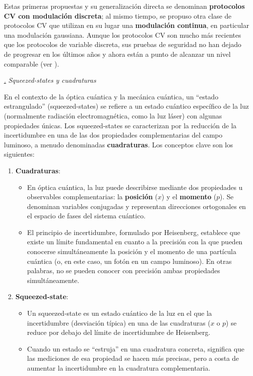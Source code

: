 \documentclass[a4paper,11pt]{book} %
\numberwithin{equation}{chapter}
\def\subsubiContadorIt{\par\addtocounter{subsubsection}{1}\underline{\it\thesubsubsection.}\hskip0.5cm \setcounter{subsubsubsectionIt}{0}}
\newcommand{\SubsubiIt}[1]{
		\subsubiContadorIt \textit{#1}
	}
\newcounter{subsubsubsectionIt}[subsubsection]
\begin{document}
Estas primeras propuestas y su generalización directa se denominan \textbf{protocolos CV con modulación discreta}; al mismo tiempo, se propuso otra clase de protocolos CV que utilizan en su lugar una \textbf{modulación continua}, en particular una modulación gaussiana. Aunque los protocolos CV son mucho más recientes que los protocolos de variable discreta, sus pruebas de seguridad no han dejado de progresar en los últimos años y ahora están a punto de alcanzar un nivel comparable (ver \cite{bib_QKD_resumen}).

		\SubsubiIt{Squeezed-states y cuadraturas}
		
En el contexto de la óptica cuántica y la mecánica cuántica, un ``estado estrangulado'' (squeezed-states) se refiere a un estado cuántico específico de la luz (normalmente radiación electromagnética, como la luz láser) con algunas propiedades únicas. Los squeezed-states se caracterizan por la reducción de la incertidumbre en una de las dos propiedades complementarias del campo luminoso, a menudo denominadas \textbf{cuadraturas}. Los conceptos clave son los siguientes: 
\begin{enumerate}
	\item \textbf{Cuadraturas}: 
	\begin{itemize}
		\item En óptica cuántica, la luz puede describirse mediante dos propiedades u observables complementarias: la \textbf{posición} ($x$) y el \textbf{momento} ($p$). Se denominan variables conjugadas y representan direcciones ortogonales en el espacio de fases del sistema cuántico.
		\item El principio de incertidumbre, formulado por Heisenberg, establece que existe un límite fundamental en cuanto a la precisión con la que pueden conocerse simultáneamente la posición y el momento de una partícula cuántica (o, en este caso, un fotón en un campo luminoso). En otras palabras, no se pueden conocer con precisión ambas propiedades simultáneamente.
	\end{itemize}

	\item \textbf{Squeezed-state}: 
	\begin{itemize}
		\item Un squeezed-state es un estado cuántico de la luz en el que la incertidumbre (desviación típica) en una de las cuadraturas ($x$ o $p$) se reduce por debajo del límite de incertidumbre de Heisenberg.
   		\item Cuando un estado se ``estruja'' en una cuadratura concreta, significa que las mediciones de esa propiedad se hacen más precisas, pero a costa de aumentar la incertidumbre en la cuadratura complementaria.
	\end{itemize}
	
\end{enumerate}
\end{document}
